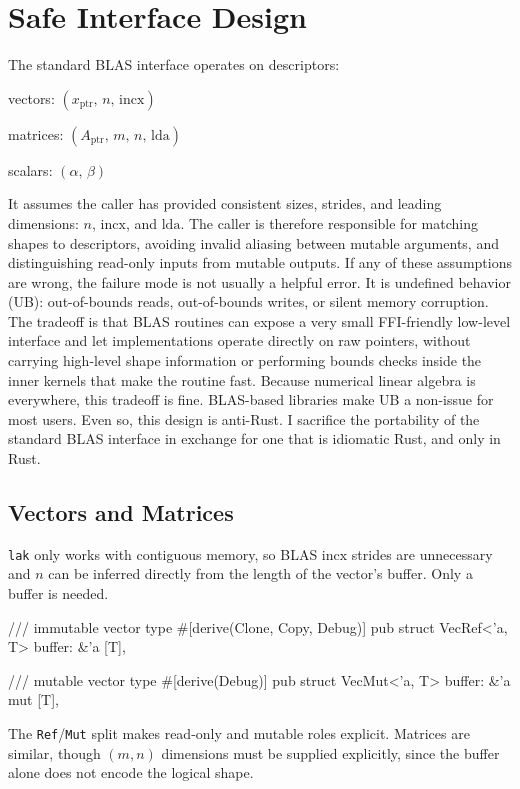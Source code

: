 \documentclass[11pt]{article}
\begin{document}
\section{Safe Interface Design}

The standard BLAS interface operates on descriptors:
\begin{notelist}
    \item vectors: \;\;\((x_{\mathrm{ptr}}, \,n, \,\mathrm{incx})\)
    \item matrices: \((A_{\mathrm{ptr}}, \,m, \,n, \,\mathrm{lda})\)
    \item scalars: \;\;\:\((\alpha, \,\beta)\)
\end{notelist}
It assumes the caller has provided consistent sizes, strides, and leading
dimensions: \(n\), \(\mathrm{incx}\), and \(\mathrm{lda}\). The caller is
therefore responsible for matching shapes to descriptors, avoiding invalid aliasing between mutable arguments, and
distinguishing read-only inputs from mutable outputs.
If any of these assumptions are wrong, the failure mode is not usually a helpful
error. It is undefined behavior (UB): out-of-bounds reads, out-of-bounds writes, or
silent memory corruption. The tradeoff is that BLAS routines can expose a very small FFI-friendly low-level interface
and let implementations operate directly on raw pointers, without carrying
high-level shape information or performing bounds checks inside the inner
kernels that make the routine fast. Because  numerical linear algebra is everywhere, this tradeoff
is fine. BLAS-based libraries make UB a 
non-issue for most users. Even so, this design is anti-Rust. I sacrifice
the portability of the standard BLAS interface in exchange for one that is
idiomatic Rust, and only in Rust. 

\subsection{Vectors and Matrices}

\texttt{lak} only works with contiguous memory, so BLAS $\mathrm{incx}$ strides are unnecessary
and $n$ can be inferred directly from the length of the vector's buffer. Only a buffer is needed.

\begin{rust}
/// immutable vector type 
#[derive(Clone, Copy, Debug)]
pub struct VecRef<'a, T> { 
    buffer: &'a [T], 
}

/// mutable vector type
#[derive(Debug)]
pub struct VecMut<'a, T> { 
    buffer: &'a mut [T], 
}
\end{rust}
The \texttt{Ref}/\texttt{Mut} split makes read-only and mutable roles explicit. Matrices are similar,
though $(m, n)$ dimensions must be supplied explicitly, since the buffer alone does not encode the logical shape.
\end{document}
